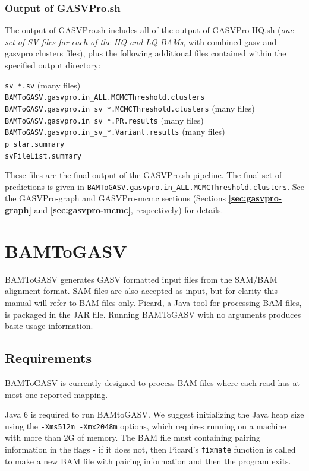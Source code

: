 \documentclass[11pt]{article}
\begin{document}
\subsubsection{Output of GASVPro.sh}
The output of GASVPro.sh includes all of the output of GASVPro-HQ.sh {(\em one set of SV files for each of the HQ and LQ BAMs}, with combined gasv and gasvpro clusters files), plus the following additional files contained within the specified output directory:
\begin{framed}
\noindent \verb+sv_*.sv+ (many files)\\
\verb+BAMToGASV.gasvpro.in_ALL.MCMCThreshold.clusters+\\
\verb+BAMToGASV.gasvpro.in_sv_*.MCMCThreshold.clusters+ (many files)\\
\verb+BAMToGASV.gasvpro.in_sv_*.PR.results+ (many files)\\
\verb+BAMToGASV.gasvpro.in_sv_*.Variant.results+ (many files)\\
\verb+p_star.summary+\\
\verb+svFileList.summary+
\end{framed}
\noindent These files are the final output of the GASVPro.sh pipeline. The final set of predictions is given in \verb+BAMToGASV.gasvpro.in_ALL.MCMCThreshold.clusters+. See the GASVPro-graph and GASVPro-mcmc sections (Sections {\bf \ref{sec:gasvpro-graph}} and {\bf \ref{sec:gasvpro-mcmc}}, respectively) for details.

\section{BAMToGASV}

BAMToGASV generates GASV formatted input files from the SAM/BAM alignment format. SAM files are also accepted as input, but for clarity this manual will refer to BAM files only.  Picard, a Java tool for processing BAM files, is packaged in the JAR file. Running BAMToGASV with no arguments produces basic usage information.

\subsection{Requirements}
   
BAMToGASV is currently designed to process BAM files where each read has at most one reported mapping. 

 Java 6 is required to run BAMtoGASV.  We suggest initializing the Java heap size using the \texttt{-Xms512m -Xmx2048m} options, which requires running on a machine with more than 2G of memory.  The BAM file must containing pairing information in the flags - if it does not, then Picard's \texttt{fixmate} function is called to make a new BAM file with pairing information and then the program exits.  
\end{document}
